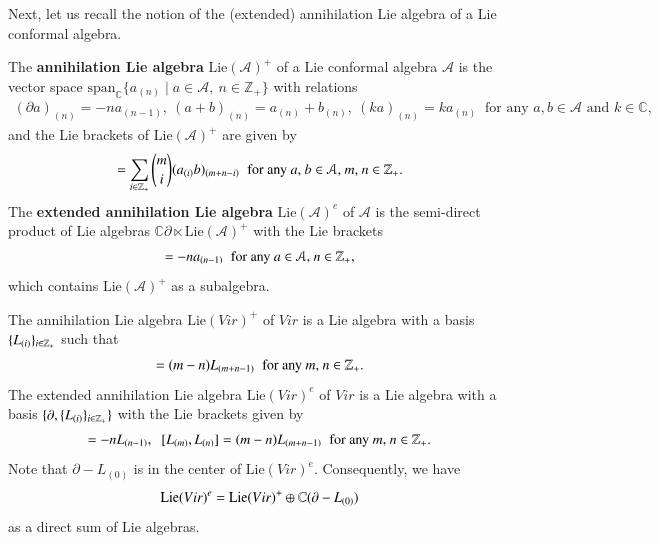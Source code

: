 \documentclass[12pt]{amsart}
\begin{document}
Next, let us recall the notion of the (extended) annihilation Lie algebra of a Lie conformal algebra.
\begin{defi} \cite{K1} The {\bf annihilation Lie algebra} $\text{Lie}( \mathcal{A})^+$ of a Lie conformal algebra $ \mathcal{A}$ is the vector space $\text{span}_\mathbb{C}\{a_{(n)}\mid a \in \mathcal{A} , \ n\in \mathbb{Z}_+\}$ with relations
\begin{eqnarray*}(\partial a)_{(n)}=-na_{(n-1)},\ (a+b)_{(n)}=a_{(n)}+b_{(n)},\ (ka)_{(n)}=ka_{(n)}\; \;\text{for any $a,b \in \mathcal{A}$ and $k \in \mathbb{C}$},
\end{eqnarray*}
and the Lie brackets of $\text{Lie}( \mathcal{A})^+$ are given by
\begin{eqnarray*}
[a_{(m)},b_{(n)}]= \sum\limits_{i\in \mathbb{Z}_+} \binom m i (a_{(i)}b)_{(m+n-i)}\;\;\text{for any $a$, $b\in \mathcal {A}$, $m$, $n\in \Z_+$.}
\end{eqnarray*}
The {\bf extended annihilation Lie algebra} $\text{Lie}( \mathcal{A})^e$ of $\mathcal{A}$ is the semi-direct product of Lie algebras $\mathbb{C}\partial \ltimes \text{Lie}( \mathcal{A})^+$ with the Lie brackets
\begin{eqnarray*}
[\partial, a_{(n)}]=-na_{(n-1)}\;\;\text{for any $a\in \mathcal{A}$, $n\in \Z_+$,}
\end{eqnarray*} which contains $\text{Lie}( \mathcal{A})^+$  as a subalgebra.
\end{defi}

\begin{ex}
The annihilation Lie algebra $\text{Lie}({Vir})^+$  of $Vir$ is a Lie algebra with a basis $\{L_{(i)}\}_{i\in \mathbb{Z}_+}$ such that
\begin{eqnarray}
[L_{(m)},L_{(n)}]=(m-n)L_{(m+n-1)} \;\;\text{for any $m$, $n\in \Z_+$.}
\end{eqnarray}
The extended annihilation Lie algebra $\text{Lie}( Vir)^e$ of $Vir$ is a Lie algebra with a basis $\{\partial, \{L_{(i)}\}_{i\in \mathbb{Z}_+}\}$ with the Lie brackets given by
\begin{eqnarray*}
[\partial, L_{(n)}]=-nL_{(n-1)},\;\;[L_{(m)},L_{(n)}]=(m-n)L_{(m+n-1)} \;\;\text{for any $m$, $n\in \Z_+$.}
\end{eqnarray*}
Note that $\partial-L_{(0)}$ is in the center of $\text{Lie}( Vir)^e$. Consequently, we have
$$\text{Lie}( Vir)^e=\text{Lie}( Vir)^+\oplus \mathbb{C}(\partial-L_{(0)})$$
as a direct sum of Lie algebras.
\end{ex}
\end{document}
